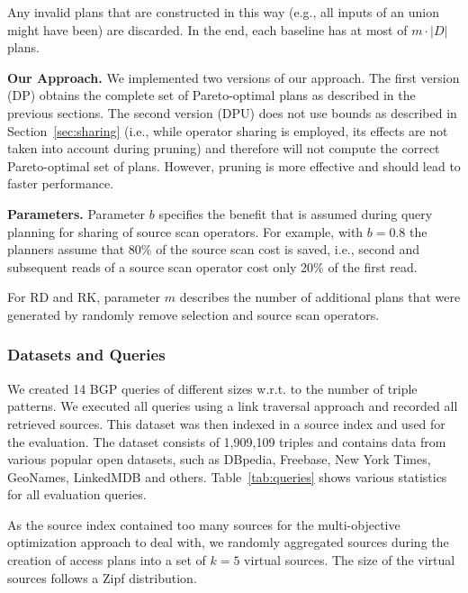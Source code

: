 Any invalid plans that are constructed in this way (e.g., all inputs
of an union might have been) are discarded. In the end, each baseline
has at most of $m \cdot |D|$ plans.

\textbf{Our Approach.} We implemented two versions of our
approach. The first version (DP) obtains the complete set of
Pareto-optimal plans as described in the previous sections. The second
version (DPU) does not use bounds as described in
Section~\ref{sec:sharing} (i.e., while operator sharing is employed,
its effects are not taken into account during pruning) and therefore
will not compute the correct Pareto-optimal set of plans. However,
pruning is more effective and should lead to faster performance.

\textbf{Parameters.} Parameter $b$ specifies the benefit that is
assumed during query planning for sharing of source scan
operators. For example, with $b=0.8$ the planners assume that 80\% of
the source scan cost is saved, i.e., second and subsequent reads of a
source scan operator cost only 20\% of the first read.

For RD and RK, parameter $m$ describes the number of additional plans
that were generated by randomly remove selection and source scan
operators.

\subsubsection{Datasets and Queries}

We created 14 BGP queries of different sizes w.r.t. to the number of
triple patterns. We executed all queries using a link traversal
approach and recorded all retrieved sources. This dataset was then
indexed in a source index and used for the evaluation. The dataset
consists of 1,909,109 triples and contains data from various popular
open datasets, such as DBpedia, Freebase, New York Times, GeoNames,
LinkedMDB and others. Table~\ref{tab:queries} shows various
statistics for all evaluation queries.

As the source index contained too many sources for the multi-objective
optimization approach to deal with, we randomly aggregated sources
during the creation of access plans into a set of $k=5$ virtual
sources. The size of the virtual sources follows a Zipf distribution.

